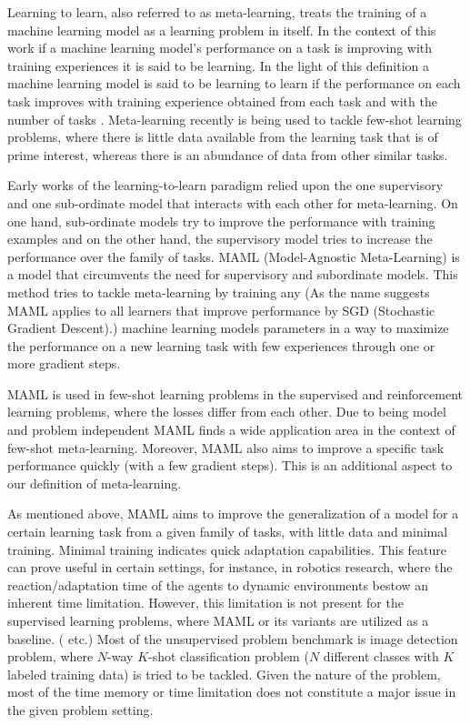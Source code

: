 
Learning to learn, also referred to as meta-learning, treats the training of a machine learning model as a learning problem in itself. In the context of this work if a machine learning model's performance on a task is improving with training experiences it is said to be learning. In the light of this definition a machine learning model is said to be learning to learn if the performance on each task improves with training experience obtained from each task and with the number of tasks \cite{thrun1998}. Meta-learning recently is being used to tackle few-shot learning problems, where there is little data available from the learning task that is of prime interest, whereas there is an abundance of data from other similar tasks. 

Early works of the learning-to-learn paradigm relied upon the one supervisory and one sub-ordinate model that interacts with each other for meta-learning. On one hand, sub-ordinate models try to improve the performance with training examples and on the other hand, the supervisory model tries to increase the performance over the family of tasks. MAML (Model-Agnostic Meta-Learning) \cite{finn2017} is a model that circumvents the need for supervisory and subordinate models. This method tries to tackle meta-learning by training any (As the name suggests MAML applies to all learners that improve performance by SGD (Stochastic Gradient Descent).) machine learning models parameters in a way to maximize the performance on a new learning task with few experiences through one or more gradient steps. 

MAML is used in few-shot learning problems in the supervised and reinforcement learning problems, where the losses differ from each other. Due to being model and problem independent MAML finds a wide application area in the context of few-shot meta-learning. Moreover, MAML also aims to improve a specific task performance quickly (with a few gradient steps). This is an additional aspect to our definition of meta-learning. 

As mentioned above, MAML aims to improve the generalization of a model for a certain learning task from a given family of tasks, with little data and minimal training. Minimal training indicates quick adaptation capabilities. This feature can prove useful in certain settings, for instance, in robotics research, where the reaction/adaptation time of the agents to dynamic environments bestow an inherent time limitation. However, this limitation is not present for the supervised learning problems, where MAML or its variants are utilized as a baseline. (\eg \cite{flennerhag2019, nichol2018, rajasegaran2020, collins2020, guiroy2019} etc.) Most of the unsupervised problem benchmark is image detection problem, where $N$-way $K$-shot classification problem ($N$ different classes with $K$ labeled training data) is tried to be tackled. Given the nature of the problem, most of the time memory or time limitation does not constitute a major issue in the given problem setting.

